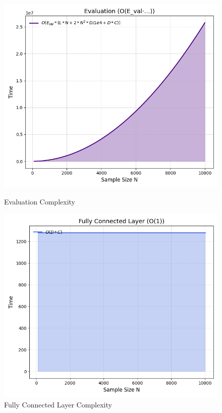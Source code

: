 \begin{figure}[htbp]
	\centering
	\begin{minipage}[b]{0.45\linewidth}
		\includegraphics[width=\linewidth]{img/paper_3/evaluation_oe_val·…}
		\caption{Evaluation Complexity}
		\label{fig:evaluationoeval}
	\end{minipage}
	\hfill
	\begin{minipage}[b]{0.45\linewidth}
		\includegraphics[width=\linewidth]{img/paper_3/fully_connected_layer_o1}
		\caption{Fully Connected Layer Complexity}
		\label{fig:fullyconnectedlayero1}
	\end{minipage}
\end{figure}

